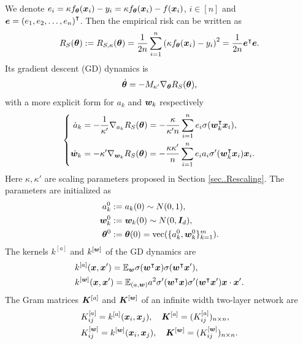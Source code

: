 \documentclass[twoside,11pt]{article}
\begin{document}
We denote $e_i = \kappa f_{\bm{\theta}}(\bm{x}_i) - y_i = \kappa f_{\bm{\theta}}(\bm{x}_i) - f(\bm{x}_i)$, $i\in[n]$ and $\bm{e} = {(e_1, e_2, \ldots, e_n)}^{\intercal}$. Then the empirical risk can be written as
\begin{equation}
    R_S(\bm{\theta}):=R_{S,\kappa}(\bm{\theta}) = \frac{1}{2n}\sum_{i=1}^n{\left(\kappa f_{\bm{\theta}}(\bm{x}_i)-y_i\right)}^2 = \frac{1}{2n}\bm{e}^{\intercal}\bm{e}.
\end{equation}
Its gradient descent (GD) dynamics is
\begin{equation}\label{eqn:gd_dyn}
    \dot{\bm{\theta}} = -M_{\kappa'}\nabla_{\bm{\theta}}R_S(\bm{\theta}),
\end{equation}
with a more explicit form for $a_k$ and $\bm{w}_k$ respectively
\begin{equation}
    \left \{
    \begin{aligned}
        \dot{a}_k   & = -\frac{1}{\kappa'}\nabla_{a_k}R_S(\bm{\theta}) = -\frac{\kappa}{\kappa'n}\sum_{i=1}^{n}e_i\sigma(\bm{w}_k^\intercal\bm{x}_i), \\
        \dot{\bm{w}}_k & =-\kappa'\nabla_{\bm{w}_k}R_S(\bm{\theta}) = -\frac{\kappa\kappa'}{n}\sum_{i=1}^n e_i a_i\sigma'(\bm{w}_k^\intercal\bm{x}_i)\bm{x}_i.
    \end{aligned}
    \right.\label{eq..MainDynamics}
\end{equation}
Here $\kappa,\kappa'$ are scaling parameters proposed in Section \ref{sec..Rescaling}.
The parameters are initialized as
\begin{align}
    a^0_k     & :=a_k(0)\sim N(0,1),                                                                    \\
    \bm{w}_k^0   & :=\bm{w}_k(0)\sim N(0,\bm{I}_d),                                                              \\
    \bm{\theta}^0 & := \bm{\theta}(0) = \mathrm{vec}(\{a_k^0, \bm{w}_k^0\}_{k=1}^m).\label{eq..MainInitialization}
\end{align}
The kernels $k^{[a]}$ and $k^{[\bm{w}]}$ of the GD dynamics are
\begin{equation}
    \begin{aligned}
         & k^{[a]}(\bm{x},\bm{x}')=\mathbb{E}_{\bm{w}}\sigma(\bm{w}^\intercal\bm{x})\sigma(\bm{w}^\intercal\bm{x}'),                        \\
         & k^{[\bm{w}]}(\bm{x},\bm{x}')=\mathbb{E}_{(a,\bm{w})}a^2\sigma'(\bm{w}^\intercal\bm{x})\sigma'(\bm{w}^\intercal\bm{x}')\bm{x}\cdot\bm{x}'. \\
    \end{aligned}
\end{equation}
The Gram matrices $\bm{K}^{[a]}$ and $\bm{K}^{[\bm{w}]}$ of an infinite width two-layer network are
\begin{equation}
    \begin{aligned}
         & K^{[a]}_{ij}=k^{[a]}(\bm{x}_i,\bm{x}_j), \quad \bm{K}^{[a]}=(K_{ij}^{[a]})_{n\times n},         \\
         & K^{[\bm{w}]}_{ij}=k^{[\bm{w}]}(\bm{x}_i,\bm{x}_j), \quad \bm{K}^{[\bm{w}]}=(K_{ij}^{[\bm{w}]})_{n\times n}.
    \end{aligned}
\end{equation}
\end{document}
